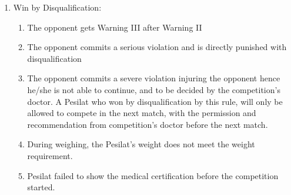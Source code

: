 \begin{legal}
\begin{legal}
\begin{legal}
\begin{enumerate}[label=\alph*.]
                \item Win by Disqualification: \\
                    \begin{enumerate}[label=\arabic*.]
                    \item The opponent gets Warning III after Warning II
                    \item The opponent commits a serious violation and is directly punished with disqualification
                    \item The opponent commits a severe violation injuring the opponent hence he/she is not able
                        to continue, and to be decided by the competition’s doctor. A Pesilat who won by
                        disqualification by this rule, will only be allowed to compete in the next match,
                        with the permission and recommendation from competition’s doctor before the
                        next match.
                    \item During weighing, the Pesilat’s weight does not meet the weight requirement.
                    \item Pesilat failed to show the medical certification before the competition started.
                    \end{enumerate}

                \end{enumerate}
            \end{legal}
    \end{legal}
\end{legal}


